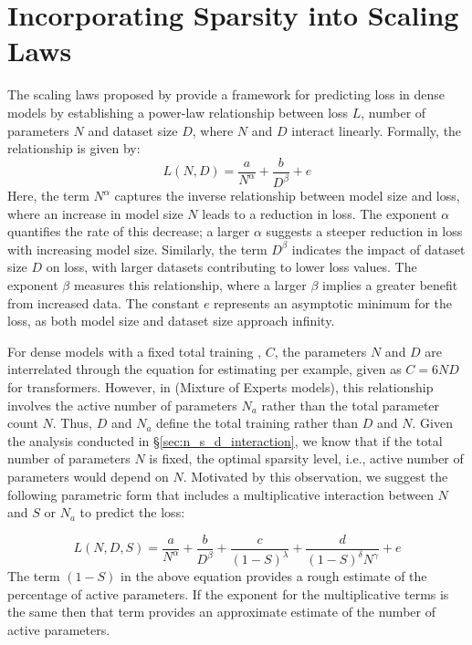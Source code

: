 \section{Incorporating Sparsity into Scaling Laws}
\label{sec:deriving_scaling_laws}
The scaling laws proposed by \citet{kaplan_scale} provide a framework for predicting loss in dense models by establishing a power-law relationship between loss \(L\), number of parameters \(N\) and dataset size \(D\), where \(N\) and \(D\) interact linearly. Formally, the relationship is given by:
\begin{equation}
L(N, D) = \frac{a}{N^{\alpha}}  + \frac{b}{D^{\beta}} + e
\label{eq:loss:dense}
\end{equation}
Here, the term \(N^{\alpha}\) captures the inverse relationship between model size and loss, where an increase in model size \(N\) leads to a reduction in loss. The exponent \(\alpha\) quantifies the rate of this decrease; a larger \(\alpha\) suggests a steeper reduction in loss with increasing model size. Similarly, the term \(D^{\beta}\) indicates the impact of dataset size \(D\) on loss, with larger datasets contributing to lower loss values. The exponent \(\beta\) measures this relationship, where a larger \(\beta\) implies a greater benefit from increased data. The constant \(e\) represents an asymptotic minimum for the loss, as both model size and dataset size approach infinity.


For dense models with a fixed total training \flops, \(C\), the parameters \(N\) and \(D\) are interrelated through the equation for estimating \flops per example, given as \(C = 6ND\) for transformers.
However, in \moes (Mixture of Experts models), this relationship involves the active number of parameters \(N_a\) rather than the total parameter count \(N\). Thus, \(D\) and \(N_a\) define the total training \flops rather than \(D\) and \(N\).
Given the analysis conducted in \S\ref{sec:n_s_d_interaction}, we know that if the total number of parameters $N$ is fixed, the optimal sparsity level, i.e., active number of parameters would depend on $N$. Motivated by this observation, we suggest the following parametric form  that includes a multiplicative interaction between $N$ and $S$ or $N_a$ to predict the loss:

\begin{equation}
    L(N, D, S) = \frac{a}{N^{\alpha}}  %
                + \frac{b}{D^{\beta}}
                + \frac{c}{\left(1-S\right)^{\lambda}}  %
                + \frac{d}{\left(1-S\right)^{\delta}N^{\gamma}}
                + e
    \label{eq:loss:moe:proposal1}
\end{equation}
The term $\left(1-S\right)$ in the above equation provides a rough estimate of the percentage of active parameters. If the exponent for the multiplicative terms is the same then that term provides an approximate estimate of the number of active parameters.

